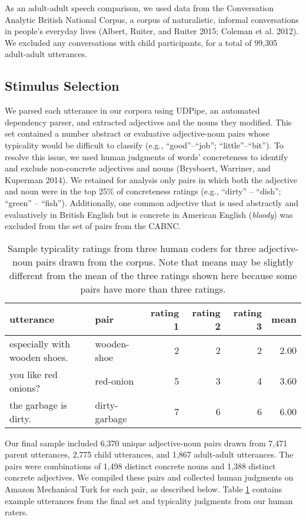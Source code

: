 \documentclass{ucetd}
\begin{document}
As an adult-adult speech comparison, we used data from the Conversation
Analytic British National Corpus, a corpus of naturalistic, informal
conversations in people's everyday lives (Albert, Ruiter, and Ruiter
2015; Coleman et al. 2012). We excluded any conversations with child
participants, for a total of 99,305 adult-adult utterances.

\hypertarget{stimulus-selection}{%
\subsection{Stimulus Selection}\label{stimulus-selection}}

We parsed each utterance in our corpora using UDPipe, an automated
dependency parser, and extracted adjectives and the nouns they modified.
This set contained a number abstract or evaluative adjective-noun pairs
whose typicality would be difficult to classify (e.g.,
``good''--``job''; ``little''--``bit''). To resolve this issue, we used
human judgments of words' concreteness to identify and exclude
non-concrete adjectives and nouns (Brysbaert, Warriner, and Kuperman
2014). We retained for analysis only pairs in which both the adjective
and noun were in the top 25\% of concreteness ratings (e.g., ``dirty''
-- ``dish''; ``green'' -- ``fish''). Additionally, one common adjective
that is used abstractly and evaluatively in British English but is
concrete in American English (\emph{bloody}) was excluded from the set
of pairs from the CABNC.

\begin{table}[tb]
\centering
\begin{tabular}{llrrrr}
  \hline
utterance & pair & rating 1 & rating 2 & rating 3 & mean \\ 
  \hline
especially with wooden shoes. & wooden-shoe &   2 &   2 &   2 & 2.00 \\ 
  you like red onions? & red-onion &   5 &   3 &   4 & 3.60 \\ 
  the garbage is dirty. & dirty-garbage &   7 &   6 &   6 & 6.00 \\ 
   \hline
\end{tabular}
\caption{Sample typicality ratings from three human coders for three adjective-noun pairs drawn from the corpus. Note that means may be slightly different from the mean of the three ratings shown here because some pairs have more than three ratings.} 
\label{tab:utt_table}
\end{table}

Our final sample included 6,370 unique adjective-noun pairs drawn from
7,471 parent utterances, 2,775 child utterances, and 1,867 adult-adult
utterances. The pairs were combinations of 1,498 distinct concrete nouns
and 1,388 distinct concrete adjectives. We compiled these pairs and
collected human judgments on Amazon Mechanical Turk for each pair, as
described below. Table \ref{tab:utt_table} contains example utterances
from the final set and typicality judgments from our human raters.
\end{document}
